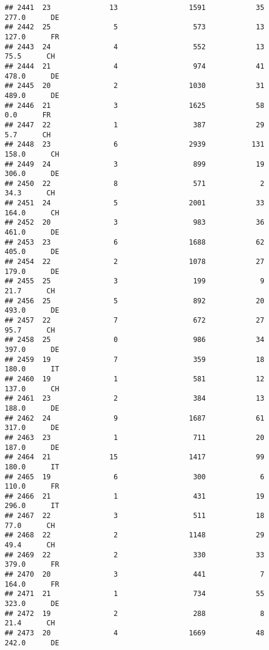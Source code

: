 \documentclass[
]{article}
\begin{document}
\begin{verbatim}
## 2441  23              13                 1591            35    277.0      DE
## 2442  25               5                  573            13    127.0      FR
## 2443  24               4                  552            13     75.5      CH
## 2444  21               4                  974            41    478.0      DE
## 2445  20               2                 1030            31    489.0      DE
## 2446  21               3                 1625            58      0.0      FR
## 2447  22               1                  387            29      5.7      CH
## 2448  23               6                 2939           131    158.0      CH
## 2449  24               3                  899            19    306.0      DE
## 2450  22               8                  571             2     34.3      CH
## 2451  24               5                 2001            33    164.0      CH
## 2452  20               3                  983            36    461.0      DE
## 2453  23               6                 1688            62    405.0      DE
## 2454  22               2                 1078            27    179.0      DE
## 2455  25               3                  199             9     21.7      CH
## 2456  25               5                  892            20    493.0      DE
## 2457  22               7                  672            27     95.7      CH
## 2458  25               0                  986            34    397.0      DE
## 2459  19               7                  359            18    180.0      IT
## 2460  19               1                  581            12    137.0      CH
## 2461  23               2                  384            13    188.0      DE
## 2462  24               9                 1687            61    317.0      DE
## 2463  23               1                  711            20    187.0      DE
## 2464  21              15                 1417            99    180.0      IT
## 2465  19               6                  300             6    110.0      FR
## 2466  21               1                  431            19    296.0      IT
## 2467  22               3                  511            18     77.0      CH
## 2468  22               2                 1148            29     49.4      CH
## 2469  22               2                  330            33    379.0      FR
## 2470  20               3                  441             7    164.0      FR
## 2471  21               1                  734            55    323.0      DE
## 2472  19               2                  288             8     21.4      CH
## 2473  20               4                 1669            48    242.0      DE

\end{verbatim}
\end{document}
